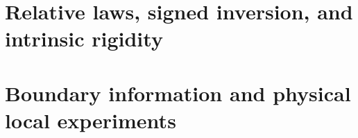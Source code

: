 \makeatletter
\def\@setabstracta{%
  \ifvoid\abstractbox\else
    \skip@20\p@ \advance\skip@-\lastskip
    \advance\skip@-\baselineskip \vskip\skip@
    \unvbox\abstractbox \prevdepth\z@
  \fi}
\makeatother
\maketitle
\setcounter{tocdepth}{1}
\tableofcontents



\part{Relative laws, signed inversion, and intrinsic rigidity}






























\part{Boundary information and physical local experiments}
